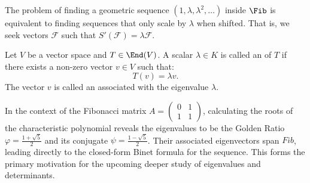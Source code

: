 The problem of finding a geometric sequence $(1, \lambda, \lambda^2, \dots)$ inside $\Fib$ is equivalent to finding sequences that only scale by $\lambda$ when shifted. That is, we seek vectors $\mathcal{F}$ such that $S'(\mathcal{F}) = \lambda \mathcal{F}$.

\begin{definition}
  Let $V$ be a vector space and $T \in \End(V)$. A scalar $\lambda \in K$ is called an  of $T$ if there exists a non-zero vector $v \in V$ such that:
  \[ T(v) = \lambda v. \]
  The vector $v$ is called an  associated with the eigenvalue $\lambda$.
\end{definition}

In the context of the Fibonacci matrix $A = \left(\begin{smallmatrix} 0 & 1 \\ 1 & 1 \end{smallmatrix}\right)$, calculating the roots of the characteristic polynomial reveals the eigenvalues to be the Golden Ratio $\varphi = \frac{1+\sqrt{5}}{2}$ and its conjugate $\psi = \frac{1-\sqrt{5}}{2}$. Their associated eigenvectors span $Fib$, leading directly to the closed-form Binet formula for the sequence. This forms the primary motivation for the upcoming deeper study of eigenvalues and determinants.